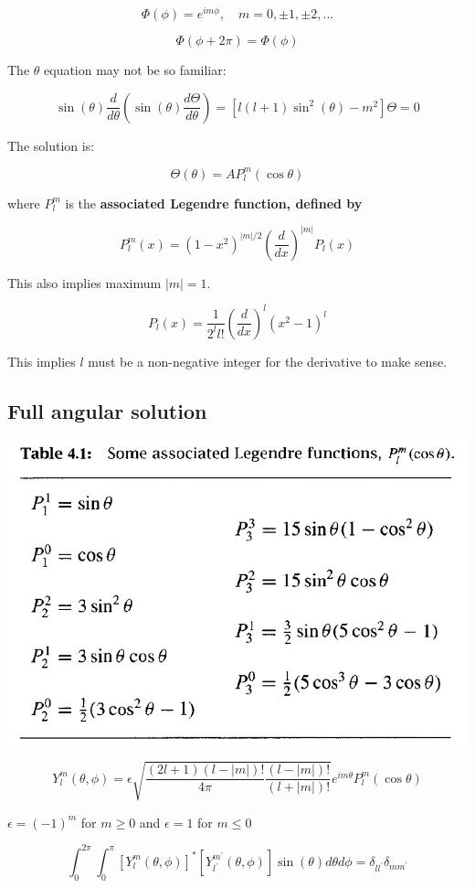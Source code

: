 \documentclass{article}
\begin{document}
$$\Phi(\phi) = e^{i m \phi}, \quad m = 0,\pm 1, \pm 2,...$$

$$\Phi(\phi + 2 \pi) = \Phi(\phi)$$

The $\theta$ equation may not be so familiar:

$$\sin (\theta) \frac{d}{d \theta} \left( \sin(\theta) \frac{d \Theta}{d \theta} \right) = \left[ l(l+1) \sin^2 (\theta) - m^2 \right] \Theta = 0$$


The solution is:

$$\Theta(\theta) = A P_l^m (\cos \theta)$$

where $P_l^m$ is the \textbf{associated Legendre function, defined by}

$$P_l^m(x) = (1-x^2)^{|m|/2} \left( \frac{d}{dx} \right)^{|m|} P_l(x)$$

This also implies maximum $|m| = 1$.

$$P_l(x) = \frac{1}{2^l l!} \left( \frac{d}{dx} \right)^l (x^2 - 1)^l$$

This implies $l$ must be a non-negative integer for the derivative to make sense. 


\subsection{Full angular solution}


\includegraphics[width=  0.6 \textwidth]{Lecture20/2.png}

$$Y_{l}^{m}(\theta, \phi)=\epsilon \sqrt{\frac{(2 l+1)(l-|m|) !}{4 \pi} \frac{(l-|m|) !}{(l+|m|) !}} e^{i m \theta} P_{l}^{m}(\cos \theta)$$

$\epsilon=(-1)^{m}$ for $m \geq 0$ and $\epsilon=1$ for $m \leq 0$

$$\int_{0}^{2 \pi} \int_{0}^{\pi}\left[Y_{l}^{m}(\theta, \phi)\right]^{*}\left[Y_{l^{\prime}}^{m^{\prime}}(\theta, \phi)\right] \sin (\theta) d \theta d \phi=\delta_{l l^{\prime}} \delta_{m m^{\prime}}$$
\end{document}
